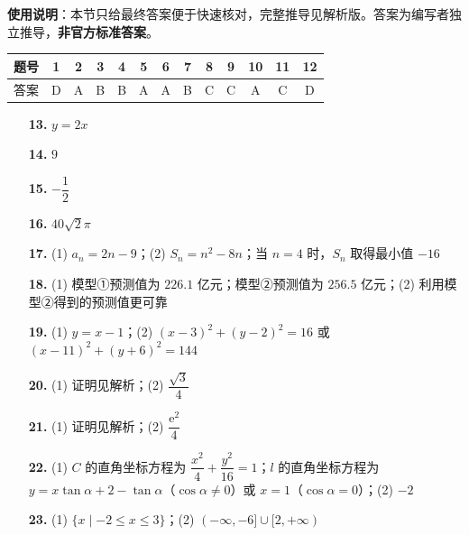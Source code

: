 
\begin{gknotice}
\textbf{使用说明}：本节只给最终答案便于快速核对，完整推导见解析版。答案为编写者独立推导，\textbf{非官方标准答案}。
\end{gknotice}

\begin{center}\begin{tabular}{ccccccccccccc}
\toprule
题号 & 1 & 2 & 3 & 4 & 5 & 6 & 7 & 8 & 9 & 10 & 11 & 12 \\
\midrule
答案 & D & A & B & B & A & A & B & C & C & A & C & D \\
\bottomrule
\end{tabular}\end{center}

\begin{itemize}[leftmargin=2.6em]
  \item[\textbf{13.}] $y=2x$
  \item[\textbf{14.}] $9$
  \item[\textbf{15.}] $-\dfrac12$
  \item[\textbf{16.}] $40\sqrt2\pi$
\end{itemize}

\begin{itemize}[leftmargin=2.6em]
  \item[\textbf{17.}] (1) $a_n=2n-9$；(2) $S_n=n^2-8n$；当 $n=4$ 时，$S_n$ 取得最小值 $-16$
  \item[\textbf{18.}] (1) 模型①预测值为 $226.1$ 亿元；模型②预测值为 $256.5$ 亿元；(2) 利用模型②得到的预测值更可靠
  \item[\textbf{19.}] (1) $y=x-1$；(2) $(x-3)^2+(y-2)^2=16$ 或 $(x-11)^2+(y+6)^2=144$
  \item[\textbf{20.}] (1) 证明见解析；(2) $\dfrac{\sqrt3}{4}$
  \item[\textbf{21.}] (1) 证明见解析；(2) $\dfrac{\mathrm e^2}{4}$
\end{itemize}

\begin{itemize}[leftmargin=2.6em]
  \item[\textbf{22.}] (1) $C$ 的直角坐标方程为 $\dfrac{x^2}{4}+\dfrac{y^2}{16}=1$；$l$ 的直角坐标方程为 $y=x\tan\alpha+2-\tan\alpha$（$\cos\alpha\ne 0$）或 $x=1$（$\cos\alpha=0$）；(2) $-2$
  \item[\textbf{23.}] (1) $\{x\mid -2\leqslant x\leqslant 3\}$；(2) $(-\infty,-6]\cup[2,+\infty)$
\end{itemize}
